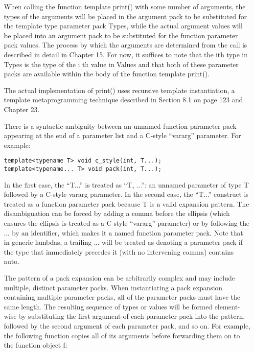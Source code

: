 When calling the function template print() with some number of arguments, the types of the arguments will be placed in the argument pack to be substituted for the template type parameter pack Types, while the actual argument values will be placed into an argument pack to be substituted for the function parameter pack values. The process by which the arguments are determined from the call is described in detail in Chapter 15. For now, it suffices to note that the ith type in Types is the type of the i th value in Values and that both of these parameter packs are available within the body of the function template print().

The actual implementation of print() uses recursive template instantiation, a template metaprogramming technique described in Section 8.1 on page 123 and Chapter 23.

There is a syntactic ambiguity between an unnamed function parameter pack appearing at the end of a parameter list and a C-style “vararg” parameter. For example:

\begin{lstlisting}[style=styleCXX]
template<typename T> void c_style(int, T...);
template<typename... T> void pack(int, T...);
\end{lstlisting}

In the first case, the “T...” is treated as “T, ...”: an unnamed parameter of type T followed by a C-style vararg parameter. In the second case, the “T...” construct is treated as a function parameter pack because T is a valid expansion pattern. The disambiguation can be forced by adding a comma before the ellipsis (which ensures the ellipsis is treated as a C-style “vararg” parameter) or by following the ... by an identifier, which makes it a named function parameter pack. Note that in generic lambdas, a trailing ... will be treated as denoting a parameter pack if the type that immediately precedes it (with no intervening comma) contains auto.


The pattern of a pack expansion can be arbitrarily complex and may include multiple, distinct parameter packs. When instantiating a pack expansion containing multiple parameter packs, all of the parameter packs must have the same length. The resulting sequence of types or values will be formed element-wise by substituting the first argument of each parameter pack into the pattern, followed by the second argument of each parameter pack, and so on. For example, the following function copies all of its arguments before forwarding them on to the function object f:


